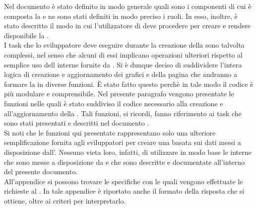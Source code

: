     Nel documento  è stato definito in modo generale quali sono i componenti di cui è composta la  e ne sono stati definiti in modo preciso i ruoli. In esso, inoltre, è stato descritto il modo in cui l'utilizzatore di  deve procedere per creare e rendere disponibile la .\\
    I task che lo sviluppatore deve eseguire durante la creazione della  sono talvolta complessi, nel senso che alcuni di essi implicano operazioni ulteriori rispetto al semplice uso dell  interne fornite da . Si è dunque deciso di suddividere l'intera logica di creazione e aggiornamento dei grafici e della pagina che andranno a formare la  in diverse funzioni. È stato fatto questo perchè in tale modo il codice è più modulare e comprensibile.
        Nel presente paragrafo vengono presentate le funzioni nelle quali è stato suddiviso il codice necessario alla creazione e all'aggiornamento della . Tali funzioni, si ricordi, fanno riferimento ai task che sono stati presentati e descritti nel documento .\\
        Si noti che le funzioni qui presentate rappresentano solo una ulteriore semplificazione fornita agli sviluppatori per creare una  basata sui dati messi a disposizione dall'. Nessuno vieta loro, infatti, di utilizzare in modo base le  interne che sono messe a disposizione da  e che sono descritte e documentate all'interno del presente documento.\\
        All'appendice  si possono trovare le specifiche con le quali vengono effettuate le richieste al  . In tale appendice è riportato anche il formato della risposta che si ottiene, oltre ai criteri per interpretarlo.


